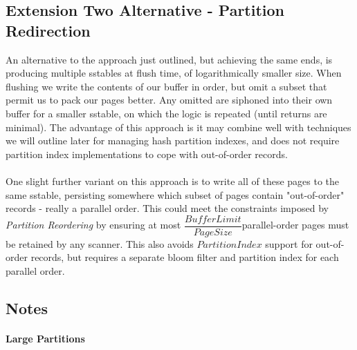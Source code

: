 \documentclass[fleqn]{article}
\begin{document}
\subsection{Extension Two Alternative - Partition Redirection}
\small
  An alternative to the approach just outlined, but achieving the same ends, is 
  producing multiple sstables at flush time, of logarithmically smaller size. 
  When flushing we write the contents of our buffer in order, but omit a subset that
  permit us to pack our pages better. Any omitted are siphoned into their own buffer for a smaller
  sstable, on which the logic is repeated (until returns are minimal). The advantage of this approach
  is it may combine well with techniques we will outline later for managing hash partition indexes,
  and does not require partition index implementations to cope with out-of-order records.
\\\\
  One slight further variant on this approach is to write all of these pages to the same sstable,
  persisting somewhere which subset of pages contain "out-of-order" records - really a parallel order.
  This could meet the constraints imposed by \textit{Partition Reordering} 
  by ensuring at most \tiny{$\dfrac{BufferLimit}{PageSize}$}\small parallel-order pages must be retained 
  by any scanner. This also avoids $PartitionIndex$ support for out-of-order records, 
  but requires a separate bloom filter and partition index for each parallel order.

\subsection{Notes}
\small
\paragraph{Large Partitions}
\end{document}
